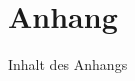\chapter{Anhang}

Inhalt des Anhangs

\newpage
\sePrintGlossary{}

\sePrintBibliography{}





\seEhrenwoertlicheErklaerung{}


